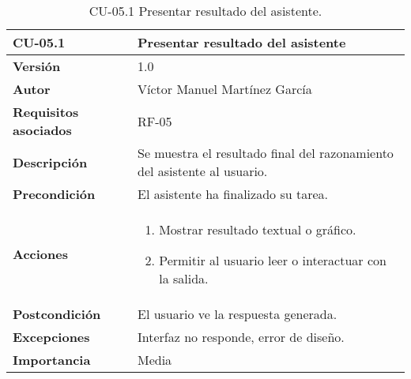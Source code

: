\begin{table}[p]
    \centering
    \begin{tabularx}{\linewidth}{ p{} p{} }
        \toprule
        \textbf{CU-05.1}    & \textbf{Presentar resultado del asistente}\\
        \toprule
        \textbf{Versión}              & 1.0 \\
        \textbf{Autor}                & Víctor Manuel Martínez García \\
        \textbf{Requisitos asociados} & RF-05 \\
        \textbf{Descripción}          & Se muestra el resultado final del razonamiento del asistente al usuario.\\
        \textbf{Precondición}         & El asistente ha finalizado su tarea.\\
        \textbf{Acciones}             &
        \begin{enumerate}
          \item Mostrar resultado textual o gráfico.
          \item Permitir al usuario leer o interactuar con la salida.
        \end{enumerate}\\
        \textbf{Postcondición}        & El usuario ve la respuesta generada.\\
        \textbf{Excepciones}          & Interfaz no responde, error de diseño.\\
        \textbf{Importancia}          & Media \\
        \bottomrule
    \end{tabularx}
    \caption{CU-05.1 Presentar resultado del asistente.}
    \label{CU-05.1 Presentar resultado del asistente}
\end{table}



